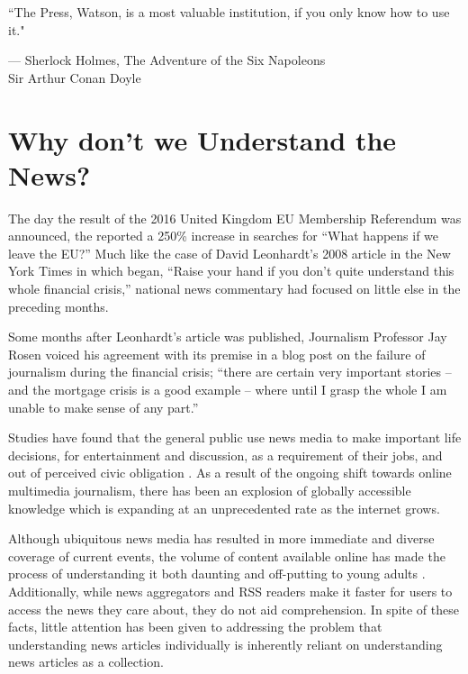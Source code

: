 \vspace{-0.5cm}
\epigraph{``The Press, Watson, is a most valuable institution, if you only know how to use it."}{--- \textup{Sherlock Holmes}, The Adventure of the Six Napoleons\\[0.2cm] \textup{Sir Arthur Conan Doyle}}

\section*{Why don't we Understand the News?}

The day the result of the 2016 United Kingdom EU Membership Referendum was announced, the \citeauthor{googletrends} reported a 250\% increase in searches for ``What happens if we leave the EU?'' Much like the case of David Leonhardt's 2008 article in the New York Times in which began, ``Raise your hand if you don't quite understand this whole financial crisis,'' national news commentary had focused on little else in the preceding months.

Some months after Leonhardt's article was published, Journalism Professor Jay Rosen voiced his agreement with its premise in a blog post on the failure of journalism during the financial crisis; ``there are certain very important stories -- and the mortgage crisis is a good example -- where until I grasp the whole I am unable to make sense of any part.''\citep{NationalExplainer}

Studies have found that the general public use news media to make important life decisions, for entertainment and discussion, as a requirement of their jobs, and out of perceived civic obligation \citep{InformationCartography,UnderstandingTheParticipatoryNewsConsumer}. As a result of the ongoing shift towards online multimedia journalism, there has been an explosion of globally accessible knowledge which is expanding at an unprecedented rate as the internet grows. 

Although ubiquitous news media has resulted in more immediate and diverse coverage of current events, the volume of content available online has made the process of understanding it both daunting and off-putting to young adults \citep{anewmodelfornews}. Additionally, while news aggregators and RSS readers make it faster for users to access the news they care about, they do not aid comprehension. In spite of these facts, little attention has been given to addressing the problem that understanding news articles individually is inherently reliant on understanding news articles as a collection. 

